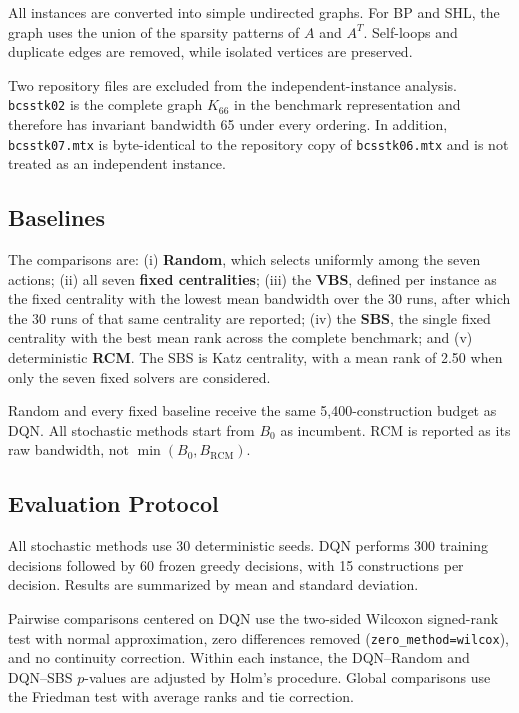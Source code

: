 \documentclass[runningheads]{llncs}
\begin{document}
All instances are converted into simple undirected graphs. For BP and SHL, the graph uses the union of the sparsity patterns of $A$ and $A^{T}$. Self-loops and duplicate edges are removed, while isolated vertices are preserved.

Two repository files are excluded from the independent-instance analysis. \texttt{bcsstk02} is the complete graph $K_{66}$ in the benchmark representation and therefore has invariant bandwidth 65 under every ordering. In addition, \texttt{bcsstk07.mtx} is byte-identical to the repository copy of \texttt{bcsstk06.mtx} and is not treated as an independent instance.

\subsection{Baselines}

The comparisons are: (i) \textbf{Random}, which selects uniformly among the seven actions; (ii) all seven \textbf{fixed centralities}; (iii) the \textbf{VBS}, defined per instance as the fixed centrality with the lowest mean bandwidth over the 30 runs, after which the 30 runs of that same centrality are reported; (iv) the \textbf{SBS}, the single fixed centrality with the best mean rank across the complete benchmark; and (v) deterministic \textbf{RCM}. The SBS is Katz centrality, with a mean rank of 2.50 when only the seven fixed solvers are considered.

Random and every fixed baseline receive the same 5,400-construction budget as DQN. All stochastic methods start from $B_0$ as incumbent. RCM is reported as its raw bandwidth, not $\min(B_0,B_{\mathrm{RCM}})$.

\subsection{Evaluation Protocol}

All stochastic methods use 30 deterministic seeds. DQN performs 300 training decisions followed by 60 frozen greedy decisions, with 15 constructions per decision. Results are summarized by mean and standard deviation.

Pairwise comparisons centered on DQN use the two-sided Wilcoxon signed-rank test with normal approximation, zero differences removed (\texttt{zero\_method=wilcox}), and no continuity correction. Within each instance, the DQN--Random and DQN--SBS $p$-values are adjusted by Holm's procedure. Global comparisons use the Friedman test with average ranks and tie correction.
\end{document}
